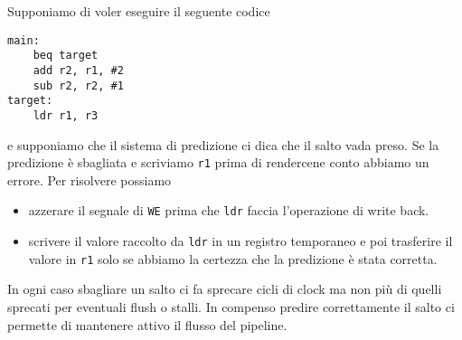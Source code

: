 Supponiamo di voler eseguire il seguente codice
\begin{verbatim}
main:
	beq target
	add r2, r1, #2
	sub r2, r2, #1
target:
	ldr r1, r3
\end{verbatim}
e supponiamo che il sistema di predizione ci dica che il salto vada preso. Se la predizione è
sbagliata e scriviamo \verb|r1| prima di rendercene conto abbiamo un errore. Per risolvere possiamo
\begin{itemize}
	\item azzerare il segnale di \verb|WE| prima che \verb|ldr| faccia l'operazione di write back.
	\item scrivere il valore raccolto da \verb|ldr| in un registro temporaneo e poi trasferire il
	      valore in \verb|r1| solo se abbiamo la certezza che la predizione è stata corretta.
\end{itemize}
In ogni caso sbagliare un salto ci fa sprecare cicli di clock ma non più di quelli sprecati per
eventuali flush o stalli. In compenso predire correttamente il salto ci permette di mantenere
attivo il flusso del pipeline.